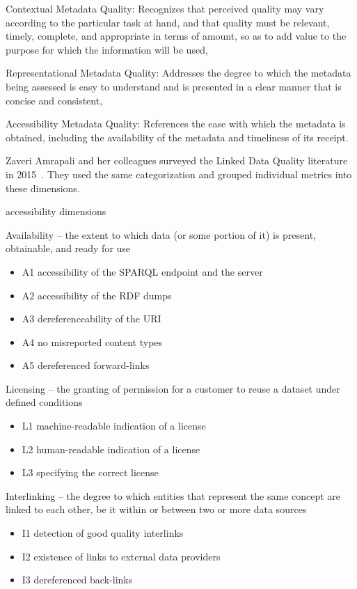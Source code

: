 Contextual Metadata Quality: Recognizes that perceived quality may vary according to the particular task at hand, and that quality must be relevant, timely, complete, and appropriate in terms of amount, so as to add value to the purpose for which the information will be used,

Representational Metadata Quality: Addresses the degree to which the metadata being assessed is easy to understand and is presented in a clear manner that is concise and consistent,

Accessibility Metadata Quality: References the ease with which the metadata is obtained, including the availability of the metadata and timeliness of its receipt.

Zaveri Amrapali and her colleagues surveyed the Linked Data Quality literature in 2015~\cite{zaveri2015}. They used the same categorization and grouped individual metrics into these dimensions.

accessibility dimensions

Availability -- the extent to which data (or some portion of it) is present, obtainable, and ready for use
\begin{itemize}
 \setlength{\parskip}{0pt}
 \setlength{\itemsep}{0pt plus 1pt}
 \item A1 accessibility of the SPARQL endpoint and the server
 \item A2 accessibility of the RDF dumps
 \item A3 dereferenceability of the URI
 \item A4 no misreported content types
 \item A5 dereferenced forward-links
\end{itemize}

Licensing -- the granting of permission for a customer to reuse a dataset under defined conditions
\begin{itemize}
 \setlength{\parskip}{0pt}
 \setlength{\itemsep}{0pt plus 1pt}
 \item L1 machine-readable indication of a license
 \item L2 human-readable indication of a license
 \item L3 specifying the correct license
\end{itemize}

Interlinking -- the degree to which entities that represent the same concept are linked to each other, be it within or between two or more data sources
\begin{itemize}
 \setlength{\parskip}{0pt}
 \setlength{\itemsep}{0pt plus 1pt}
 \item I1 detection of good quality interlinks
 \item I2 existence of links to external data providers
 \item I3 dereferenced back-links
\end{itemize}

